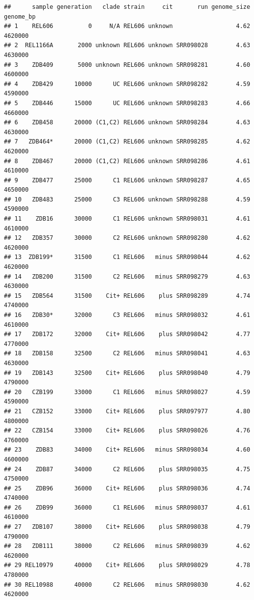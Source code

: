\documentclass[
]{book}
\begin{document}
\begin{verbatim}
##      sample generation   clade strain     cit       run genome_size genome_bp
## 1    REL606          0     N/A REL606 unknown                  4.62   4620000
## 2  REL1166A       2000 unknown REL606 unknown SRR098028        4.63   4630000
## 3    ZDB409       5000 unknown REL606 unknown SRR098281        4.60   4600000
## 4    ZDB429      10000      UC REL606 unknown SRR098282        4.59   4590000
## 5    ZDB446      15000      UC REL606 unknown SRR098283        4.66   4660000
## 6    ZDB458      20000 (C1,C2) REL606 unknown SRR098284        4.63   4630000
## 7   ZDB464*      20000 (C1,C2) REL606 unknown SRR098285        4.62   4620000
## 8    ZDB467      20000 (C1,C2) REL606 unknown SRR098286        4.61   4610000
## 9    ZDB477      25000      C1 REL606 unknown SRR098287        4.65   4650000
## 10   ZDB483      25000      C3 REL606 unknown SRR098288        4.59   4590000
## 11    ZDB16      30000      C1 REL606 unknown SRR098031        4.61   4610000
## 12   ZDB357      30000      C2 REL606 unknown SRR098280        4.62   4620000
## 13  ZDB199*      31500      C1 REL606   minus SRR098044        4.62   4620000
## 14   ZDB200      31500      C2 REL606   minus SRR098279        4.63   4630000
## 15   ZDB564      31500    Cit+ REL606    plus SRR098289        4.74   4740000
## 16   ZDB30*      32000      C3 REL606   minus SRR098032        4.61   4610000
## 17   ZDB172      32000    Cit+ REL606    plus SRR098042        4.77   4770000
## 18   ZDB158      32500      C2 REL606   minus SRR098041        4.63   4630000
## 19   ZDB143      32500    Cit+ REL606    plus SRR098040        4.79   4790000
## 20   CZB199      33000      C1 REL606   minus SRR098027        4.59   4590000
## 21   CZB152      33000    Cit+ REL606    plus SRR097977        4.80   4800000
## 22   CZB154      33000    Cit+ REL606    plus SRR098026        4.76   4760000
## 23    ZDB83      34000    Cit+ REL606   minus SRR098034        4.60   4600000
## 24    ZDB87      34000      C2 REL606    plus SRR098035        4.75   4750000
## 25    ZDB96      36000    Cit+ REL606    plus SRR098036        4.74   4740000
## 26    ZDB99      36000      C1 REL606   minus SRR098037        4.61   4610000
## 27   ZDB107      38000    Cit+ REL606    plus SRR098038        4.79   4790000
## 28   ZDB111      38000      C2 REL606   minus SRR098039        4.62   4620000
## 29 REL10979      40000    Cit+ REL606    plus SRR098029        4.78   4780000
## 30 REL10988      40000      C2 REL606   minus SRR098030        4.62   4620000
\end{verbatim}
\end{document}
